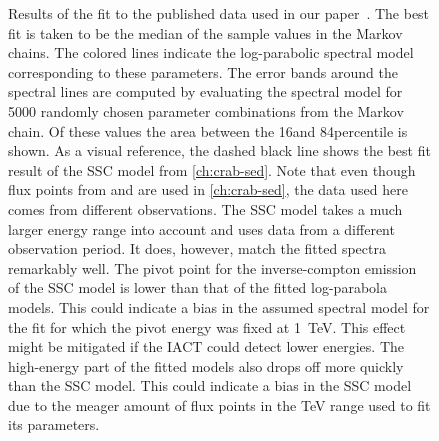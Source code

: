 \begin{figure}
  \centering
  
  \caption[Results of the \pymc spectral fits]{Results of the \pymc fit to the published data used in our paper~\cite{joint_crab}. 
  The best fit is taken to be the median of the sample values in the Markov chains.
  The colored lines indicate the log-parabolic spectral model corresponding to these parameters.
  The error bands around the spectral lines are computed by evaluating the spectral model for 5000 randomly chosen 
  parameter combinations from the Markov chain. Of these values the area between the 16\th and 84\th percentile is shown.
  As a visual reference, the dashed black line shows the best fit result of the SSC model 
  from \cref{ch:crab-sed}. Note that even though flux points from \hess and \magic are used in \cref{ch:crab-sed}, the data used here comes from different observations. 
  The SSC model takes a much larger energy range into account and uses data from a different observation period.
  It does, however, match the fitted spectra remarkably well. The pivot point for the inverse-compton emission 
  of the SSC model is lower than that of the fitted log-parabola models. This could indicate a bias in the assumed spectral model
  for the fit for which the pivot energy was fixed at \SI{1}{TeV}. This effect might be mitigated if the IACT could detect lower energies.
  The high-energy part of the fitted models also drops off more quickly than the SSC model. This could indicate a bias in the SSC model 
  due to the meager amount of flux points in the \si{TeV} range used to fit its parameters. 
  }
  \label{fig:pymc_fit_spectrum}
\end{figure}

